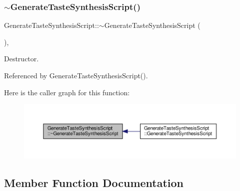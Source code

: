 \subsubsection{\texorpdfstring{$\sim$\+Generate\+Taste\+Synthesis\+Script()}{~GenerateTasteSynthesisScript()}}
{\footnotesize\ttfamily Generate\+Taste\+Synthesis\+Script\+::$\sim$\+Generate\+Taste\+Synthesis\+Script (\begin{DoxyParamCaption}{ }\end{DoxyParamCaption})\hspace{0.3cm}{\ttfamily [override]}, {\ttfamily [default]}}



Destructor. 



Referenced by Generate\+Taste\+Synthesis\+Script().

Here is the caller graph for this function\+:
\nopagebreak
\begin{figure}[H]
\begin{center}
\leavevmode
\includegraphics[width=350pt]{d3/d54/classGenerateTasteSynthesisScript_a3eef3d4e0e73974ea2bd47ebd59fe08a_icgraph}
\end{center}
\end{figure}


\subsection{Member Function Documentation}
\mbox{\label{classGenerateTasteSynthesisScript_a1100f2d9ab2b4d5cc3ae87ef751c9097}} 
